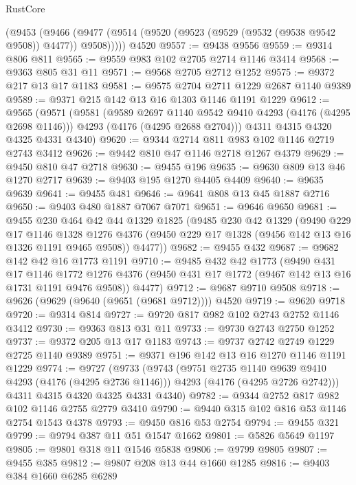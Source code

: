 \begin{lexlean}{RustCore}
\begin{coremodule}
    (@9453 (@9466 (@9477 (@9514 (@9520 (@9523 (@9529 (@9532 (@9538 @9542 @9508)) @4477)) @9508)))))
    @4520
@9557 := @9438 @9556
@9559 := @9314 @806 @811
@9565 := @9559 @983 @102 @2705 @2714 @1146 @3414
@9568 := @9363 @805 @31 @11
@9571 := @9568 @2705 @2712 @1252
@9575 := @9372 @217 @13 @17 @1183
@9581 := @9575 @2704 @2711 @1229 @2687 @1140 @9389
@9589 := @9371 @215 @142 @13 @16 @1303 @1146 @1191 @1229
@9612 := @9565
    (@9571
      (@9581
        (@9589 @2697 @1140 @9542 @9410 @4293 (@4176 (@4295 @2698 @1146)))
        @4293
        (@4176 (@4295 @2688 @2704)))
      @4311
      @4315
      @4320
      @4325
      @4331
      @4340)
@9620 := @9344 @2714 @811 @983 @102 @1146 @2719 @2743 @3412
@9626 := @9442 @810 @47 @1146 @2718 @1267 @4379
@9629 := @9450 @810 @47 @2718
@9630 := @9455 @196
@9635 := @9630 @809 @13 @46 @1270 @2717
@9639 := @9403 @195 @1270 @4405 @4409
@9640 := @9635 @9639
@9641 := @9455 @481
@9646 := @9641 @808 @13 @45 @1887 @2716
@9650 := @9403 @480 @1887 @7067 @7071
@9651 := @9646 @9650
@9681 := @9455
    @230
    @464
    @42
    @44
    @1329
    @1825
    (@9485
      @230
      @42
      @1329
      (@9490
        @229
        @17
        @1146
        @1328
        @1276
        @4376
        (@9450 @229 @17 @1328 (@9456 @142 @13 @16 @1326 @1191 @9465 @9508))
        @4477))
@9682 := @9455 @432
@9687 := @9682 @142 @42 @16 @1773 @1191
@9710 := @9485
    @432
    @42
    @1773
    (@9490
      @431
      @17
      @1146
      @1772
      @1276
      @4376
      (@9450 @431 @17 @1772 (@9467 @142 @13 @16 @1731 @1191 @9476 @9508))
      @4477)
@9712 := @9687 @9710 @9508
@9718 := @9626 (@9629 (@9640 (@9651 (@9681 @9712)))) @4520
@9719 := @9620 @9718
@9720 := @9314 @814
@9727 := @9720 @817 @982 @102 @2743 @2752 @1146 @3412
@9730 := @9363 @813 @31 @11
@9733 := @9730 @2743 @2750 @1252
@9737 := @9372 @205 @13 @17 @1183
@9743 := @9737 @2742 @2749 @1229 @2725 @1140 @9389
@9751 := @9371 @196 @142 @13 @16 @1270 @1146 @1191 @1229
@9774 := @9727
    (@9733
      (@9743
        (@9751 @2735 @1140 @9639 @9410 @4293 (@4176 (@4295 @2736 @1146)))
        @4293
        (@4176 (@4295 @2726 @2742)))
      @4311
      @4315
      @4320
      @4325
      @4331
      @4340)
@9782 := @9344 @2752 @817 @982 @102 @1146 @2755 @2779 @3410
@9790 := @9440 @315 @102 @816 @53 @1146 @2754 @1543 @4378
@9793 := @9450 @816 @53 @2754
@9794 := @9455 @321
@9799 := @9794 @387 @11 @51 @1547 @1662
@9801 := @5826 @5649 @1197
@9805 := @9801 @318 @11 @1546 @5838
@9806 := @9799 @9805
@9807 := @9455 @385
@9812 := @9807 @208 @13 @44 @1660 @1285
@9816 := @9403 @384 @1660 @6285 @6289

\end{coremodule}
\end{lexlean}
